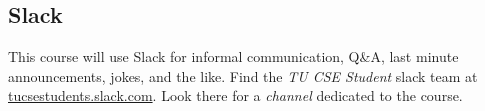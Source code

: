 \subsection{Slack}

This course will use Slack
for informal communication,
Q\&A,
last minute announcements,
jokes,
and the like.
Find the \emph{TU CSE Student} slack team at
\url{tucsestudents.slack.com}.
Look there for a \emph{channel}
dedicated to the course.
